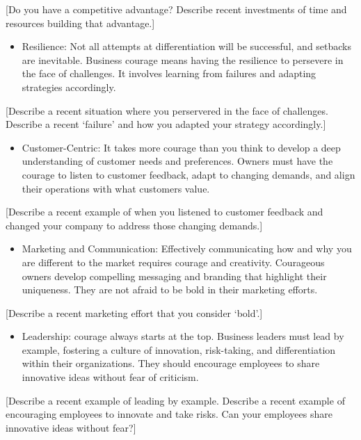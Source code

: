\documentclass[
]{book}
\providecommand{\tightlist}{%
  \setlength{\itemsep}{0pt}\setlength{\parskip}{0pt}}
\begin{document}
{{[}Do you have a competitive advantage? Describe recent investments of time and resources building that advantage.{]}}

\begin{itemize}
\tightlist
\item
  Resilience: Not all attempts at differentiation will be successful, and setbacks are inevitable. Business courage means having the resilience to persevere in the face of challenges. It involves learning from failures and adapting strategies accordingly.
\end{itemize}

{{[}Describe a recent situation where you perservered in the face of challenges. Describe a recent `failure' and how you adapted your strategy accordingly.{]}}

\begin{itemize}
\tightlist
\item
  Customer-Centric: It takes more courage than you think to develop a deep understanding of customer needs and preferences. Owners must have the courage to listen to customer feedback, adapt to changing demands, and align their operations with what customers value.
\end{itemize}

{{[}Describe a recent example of when you listened to customer feedback and changed your company to address those changing demands.{]}}

\begin{itemize}
\tightlist
\item
  Marketing and Communication: Effectively communicating how and why you are different to the market requires courage and creativity. Courageous owners develop compelling messaging and branding that highlight their uniqueness. They are not afraid to be bold in their marketing efforts.
\end{itemize}

{{[}Describe a recent marketing effort that you consider `bold'.{]}}

\begin{itemize}
\tightlist
\item
  Leadership: courage always starts at the top. Business leaders must lead by example, fostering a culture of innovation, risk-taking, and differentiation within their organizations. They should encourage employees to share innovative ideas without fear of criticism.
\end{itemize}

{{[}Describe a recent example of leading by example. Describe a recent example of encouraging employees to innovate and take risks. Can your employees share innovative ideas without fear?{]}}
\end{document}
